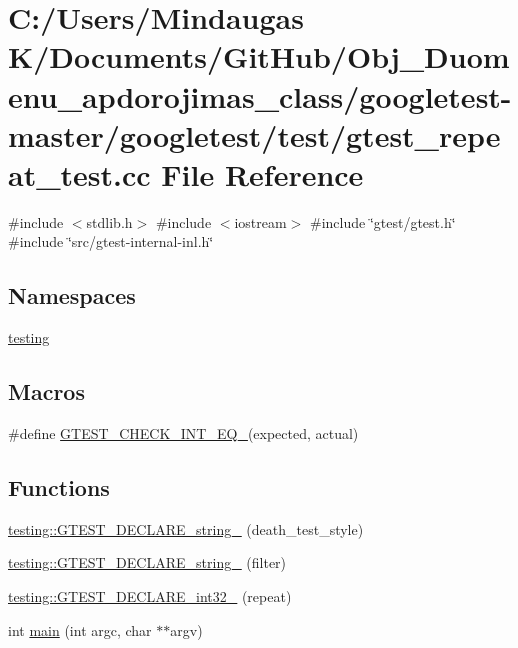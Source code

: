 \hypertarget{googletest-master_2googletest_2test_2gtest__repeat__test_8cc}{}\section{C\+:/\+Users/\+Mindaugas K/\+Documents/\+Git\+Hub/\+Obj\+\_\+\+Duomenu\+\_\+apdorojimas\+\_\+class/googletest-\/master/googletest/test/gtest\+\_\+repeat\+\_\+test.cc File Reference}
\label{googletest-master_2googletest_2test_2gtest__repeat__test_8cc}
{\ttfamily \#include $<$stdlib.\+h$>$}\newline
{\ttfamily \#include $<$iostream$>$}\newline
{\ttfamily \#include \char`\"{}gtest/gtest.\+h\char`\"{}}\newline
{\ttfamily \#include \char`\"{}src/gtest-\/internal-\/inl.\+h\char`\"{}}\newline
\subsection*{Namespaces}
\begin{DoxyCompactItemize}
\item 
 \mbox{\hyperlink{namespacetesting}{testing}}
\end{DoxyCompactItemize}
\subsection*{Macros}
\begin{DoxyCompactItemize}
\item 
\#define \mbox{\hyperlink{googletest-master_2googletest_2test_2gtest__repeat__test_8cc_a7e5ba7c523079f679398b4c730184de3}{G\+T\+E\+S\+T\+\_\+\+C\+H\+E\+C\+K\+\_\+\+I\+N\+T\+\_\+\+E\+Q\+\_\+}}(expected,  actual)
\end{DoxyCompactItemize}
\subsection*{Functions}
\begin{DoxyCompactItemize}
\item 
\mbox{\hyperlink{namespacetesting_a37b7e87f0a5f502c6918f37d1768c1f3}{testing\+::\+G\+T\+E\+S\+T\+\_\+\+D\+E\+C\+L\+A\+R\+E\+\_\+string\+\_\+}} (death\+\_\+test\+\_\+style)
\item 
\mbox{\hyperlink{namespacetesting_a20d69860ce843142c7f740262e6b0c9a}{testing\+::\+G\+T\+E\+S\+T\+\_\+\+D\+E\+C\+L\+A\+R\+E\+\_\+string\+\_\+}} (filter)
\item 
\mbox{\hyperlink{namespacetesting_a315ef0647e4f2795bf1705de8e9c9659}{testing\+::\+G\+T\+E\+S\+T\+\_\+\+D\+E\+C\+L\+A\+R\+E\+\_\+int32\+\_\+}} (repeat)
\item 
int \mbox{\hyperlink{googletest-master_2googletest_2test_2gtest__repeat__test_8cc_a3c04138a5bfe5d72780bb7e82a18e627}{main}} (int argc, char $\ast$$\ast$argv)
\end{DoxyCompactItemize}


